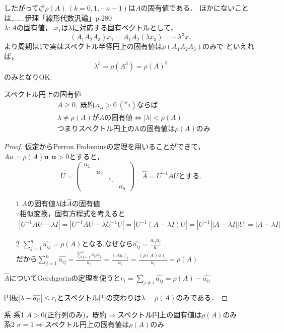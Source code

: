 したがって${\zeta}^k \rho (A)\ (k=0,1,\cdots n-1)$は$A$の固有値である．
ほかにないことは,......伊理「線形代数汎論」p.280\\
$\lambda :A$の固有値，
$x_1$は$\lambda$に対応する固有ベクトルとして，
\begin{equation*}
  (A_1 A_2 A_3 )x_1 = A_1 A_2 (\lambda x_3 )=\cdots {\lambda}^3 x_1
\end{equation*}
より周期は1で実はスペクトル半径円上の固有値は$\rho (A_1 A_2 A_3 )$のみで
といえれば，
\begin{equation}
    \lambda^3 = \rho(A^3) = \rho(A)^3
\end{equation}
のみとなりOK.
\\
\begin{itembox}[l]{スペクトル円上の固有値}
  \begin{align}
  &A\geq 0,\ 既約.a_{ii}>0 \ ({}^{\forall}i)\text{ならば}\\
  &\lambda\neq\rho (A)がAの固有値\Leftrightarrow |\lambda |<\rho (A)\\
 &\text{つまりスペクトル円上のAの固有値は$\rho(A)$のみ}
\end{align}
\end{itembox}
\begin{proof}
仮定からPerron Frobeniusの定理を用いることができて，
$Au=\rho (A)\bm{u}\ \ \bm{u}>0$とすると，
\begin{equation}
  U=
  \begin{pmatrix}
    u_1&&&\\
    &u_2&&\\
    &&\ddots&\\
    &&&u_n
  \end{pmatrix}\quad \hat{A}=U^{-1}AUとする.
  \end{equation}
\begin{itemize}
  \item[1]$A$の固有値$\lambda$は$\hat{A}$の固有値\\
  $\because$相似変換，固有方程式を考えると
  \begin{align}
      |U^{-1}AU - \lambda I|
      =|U^{-1}AU - \lambda U^{-1}U|
      =|U^{-1}(A -\lambda I ) U|
      = |U^{-1}| |A-\lambda I | |U|
      = | A-\lambda I|
  \end{align}
  \item[2]$\sum_{j=1}^n
  \hat{a_{ij}}=\rho (A)$となる.なぜなら$ \hat{a_{ij}}=\displaystyle\frac{a_{ij}u_j}{u_i}$\\
  だから$\sum_{j=1}^n \hat{a_{ij}}=\displaystyle\frac{\sum_{j=1}^n a_{ij}u_j}{u_i}=\frac{{(Au)}_i}{u_i}=\frac{{(\rho (A)u)}_i}{u_i}=\rho (A)$
\end{itemize}

$\hat{A}$についてGershgorinの定理を使うと$r_i = \sum_{j\neq i}\hat{a_{ij}}=\rho (A)-\hat{a_{ii}}$

円板$|\lambda -\hat{a_{ii}}|\leq r_i$とスペクトル円の交わりは$\lambda =\rho (A)$のみである．
\end{proof}
\begin{itembox}[l]{系}
  系1 $A>0$(正行列のみ)，既約$\Rightarrow$スペクトル円上の固有値は$\rho (A)$のみ\\
  系2 $\sigma =1\Rightarrow$スペクトル円上の固有値は$\rho (A)$のみ
\end{itembox}

